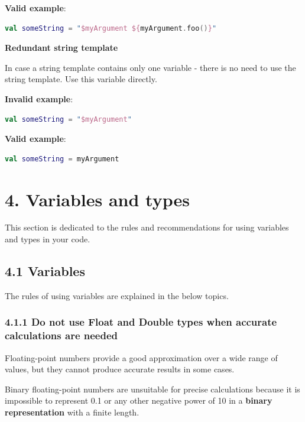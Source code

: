 \textbf{Valid example}:

\begin{lstlisting}[language=Kotlin]
val someString = "$myArgument ${myArgument.foo()}"
\end{lstlisting}


\textbf{Redundant string template}



In case a string template contains only one variable - there is no need to use the string template. Use this variable directly.



\textbf{Invalid example}:

\begin{lstlisting}[language=Kotlin]
val someString = "$myArgument"
\end{lstlisting}


\textbf{Valid example}:

\begin{lstlisting}[language=Kotlin]
val someString = myArgument
\end{lstlisting}
\section*{\textbf{4. Variables and types}}

\label{sec:4.}

This section is dedicated to the rules and recommendations for using variables and types in your code.

\subsection*{\textbf{4.1 Variables}}

\label{sec:4.1}

The rules of using variables are explained in the below topics.

\subsubsection*{\textbf{4.1.1 Do not use Float and Double types when accurate calculations are needed}}
\leavevmode\newline

\label{sec:4.1.1}

Floating-point numbers provide a good approximation over a wide range of values, but they cannot produce accurate results in some cases.

Binary floating-point numbers are unsuitable for precise calculations because it is impossible to represent 0.1 or any other negative power of 10 in a \textbf{binary representation} with a finite length.




